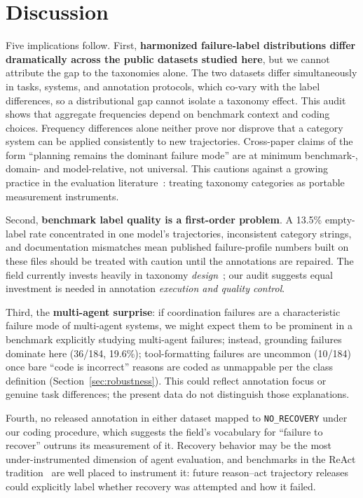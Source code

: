 \documentclass[12pt,letterpaper]{article}
\begin{document}
\section{Discussion}
\label{sec:discussion}
Five implications follow. First, \textbf{harmonized failure-label
distributions differ dramatically across the public datasets studied
here}, but we cannot attribute the gap to the taxonomies alone. The two
datasets differ simultaneously in tasks, systems, and annotation protocols,
which co-vary with the label differences, so a distributional gap cannot
isolate a taxonomy effect. This audit shows that aggregate frequencies depend on benchmark context
and coding choices. Frequency differences alone neither prove nor disprove
that a category system can be applied consistently to new trajectories. Cross-paper claims of the form ``planning remains
the dominant failure mode'' are at minimum benchmark-, domain- and
model-relative, not universal. This cautions against a growing practice in
the evaluation literature~\cite{yehudai2025survey}: treating taxonomy
categories as portable measurement instruments.

Second, \textbf{benchmark label quality is a first-order problem}. A 13.5\%
empty-label rate concentrated in one model's trajectories, inconsistent
category strings, and documentation mismatches mean published failure-profile
numbers built on these files should be treated with caution until the
annotations are repaired. The field currently invests heavily in taxonomy
\emph{design}~\cite{zhu2025agentdebug,zhang2025whowhen}; our audit suggests
equal investment is needed in annotation \emph{execution and quality
control}.

Third, the \textbf{multi-agent surprise}: if coordination failures are a
characteristic failure mode of multi-agent systems, we might expect them to
be prominent in a benchmark explicitly studying multi-agent failures;
instead, grounding failures dominate here (36/184, 19.6\%); tool-formatting failures are uncommon (10/184) once bare ``code is incorrect'' reasons are coded as unmappable per the class definition (Section~\ref{sec:robustness}). This could reflect annotation focus or genuine task differences;
the present data do not distinguish those explanations.

Fourth, no released annotation in either dataset mapped to
\texttt{NO\_RECOVERY} under our coding procedure, which suggests the field's vocabulary for
``failure to recover'' outruns its measurement of it. Recovery behavior may
be the most under-instrumented dimension of agent evaluation, and benchmarks
in the ReAct tradition~\cite{yao2023react} are well placed to instrument it:
future reason--act trajectory releases could explicitly label whether
recovery was attempted and how it failed.
\end{document}

